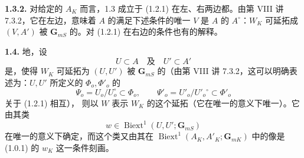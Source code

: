 \textbf{1.3.2.} 对给定的 $A_K$ 而言，1.3 成立于 (1.2.1) 在左、右两边都。由第 VIII 讲 7.3.2，它在左边，意味着 $A$ 的满足下述条件的唯一 $V$ 是 $A$ 的 $A^\circ$：$W_K$ 可延拓成 $(V,A')$ 被 $\mathbf G_{mS}$ 的。对 (1.2.1) 在右边的条件也有的解释。

\textbf{1.4.} 地，设
\[U\subset A\quad\text{及}\quad U'\subset A'\tag{1.4.1}\]
是，使得 $W_K$ 可延拓为 $(U,U')$ 被 $\mathbf G_{mS}$ 的（由第 VIII 讲 7.3.2，这可以明确表述为：$U,U'$ 所定义的 $\Phi_o,\Phi'_o$ 的
\[\Psi_o=U_o/U_o^\circ\subset\Phi_o,\qquad\Psi'_o=U'_o/U'_o{}^\circ\subset\Phi'_o\tag{1.4.2}\]
关于 (1.2.1) 相互），
则以 $W$ 表示 $W_K$ 的这个延拓（它在唯一的意义下唯一）。它由其类
\[w\in\operatorname{Biext}^1(U,U';\mathbf G_{mS})\tag{1.4.3}\]
在唯一的意义下确定，而这个类又由其在 $\operatorname{Biext}^1(A_K,A'_K;\mathbf G_{mK})$ 中的像是 (1.0.1) 的 $w_K$ 这一条件刻画。

